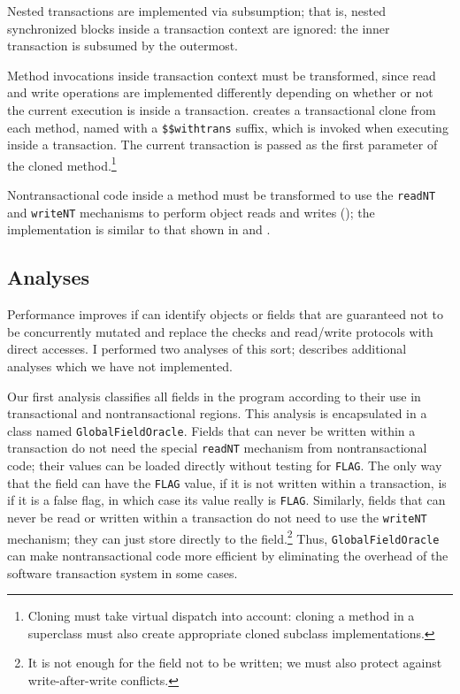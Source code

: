 Nested transactions are implemented via subsumption; that is, nested
synchronized blocks inside a transaction context are ignored: the
inner transaction is subsumed by the outermost.

\label{sec:withtrans}
Method invocations inside transaction context must be transformed,
since read and write operations are implemented differently depending
on whether or not the current execution is inside a transaction.  \Flex
creates a transactional clone from each method, named with a
\texttt{\$\$withtrans} suffix, which is invoked when executing
inside a transaction.  The current transaction is passed as the first
parameter of the cloned method.\footnote{Cloning must take virtual
  dispatch into account: cloning a method in a superclass must also
  create appropriate cloned subclass implementations.}

Nontransactional code inside a method must be transformed to use the
\texttt{readNT} and \texttt{writeNT} mechanisms to perform object
reads and writes (); the implementation is similar to
that shown in  and .

\subsection{Analyses}\label{sec:hoist} %
Performance improves if \flex can identify objects or fields
that are guaranteed not to be concurrently mutated and replace the
checks and read/write protocols with direct accesses.  I performed two
analyses of this sort;  describes additional analyses
which we have not implemented.

Our first analysis classifies all fields in the program according to
their use in transactional and nontransactional regions.  This
analysis is encapsulated in a \flex class named
\texttt{GlobalFieldOracle}.  Fields that can never be written within
a transaction do not need the special \texttt{readNT} mechanism from
nontransactional code; their values can be loaded directly without
testing for \texttt{FLAG}.  The only way that the field can have the
\texttt{FLAG} value, if it is not written within a transaction, is if
it is a false flag, in which case its value really is \texttt{FLAG}.
Similarly, fields that can never be read or written within a
transaction do not need to use the \texttt{writeNT} mechanism; they
can just store directly to the field.\footnote{It is not
  enough for the field not to be written; we must also protect against
  write-after-write conflicts.}  Thus, \texttt{GlobalFieldOracle} can
make nontransactional code more efficient by eliminating the overhead
of the software transaction system in some cases.

